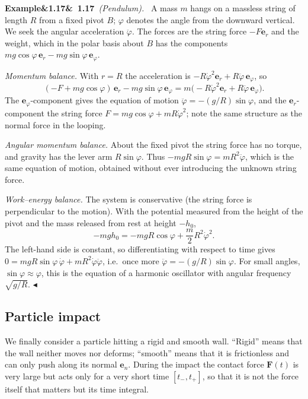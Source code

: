 \documentclass[11pt,a4paper,oneside]{report}
\numberwithin{equation}{chapter}
\newcommand{\vect}[1]{\bm{#1}}
\newcommand{\e}[1]{\vect{e}_{#1}}
\theoremstyle{plain}
\theoremstyle{definition}
\theoremstyle{remark}
\newenvironment{example}[2]{%
  \par\addvspace{\bigskipamount}\noindent
  \textbf{Example\ifx&#1&\else~#1\fi}\ \textit{(#2).}\ \ignorespaces}%
  {\hfill$\blacktriangleleft$\par\addvspace{\bigskipamount}}
\begin{document}
\begin{example}{1.17}{Pendulum}
A mass $m$ hangs on a massless string of length $R$ from a fixed pivot $B$; $\varphi$ denotes the angle from the
downward vertical. We seek the angular acceleration $\ddot\varphi$. The forces are the string force $-F\e r$ and the
weight, which in the polar basis about $B$ has the components $mg\cos\varphi\,\e r-mg\sin\varphi\,\e\varphi$.

\emph{Momentum balance.} With $r=R$ the acceleration is $-R\dot\varphi^2\e r+R\ddot\varphi\,\e\varphi$, so
\[
  (-F+mg\cos\varphi)\,\e r-mg\sin\varphi\,\e\varphi=m\big(-R\dot\varphi^2\e r+R\ddot\varphi\,\e\varphi\big).
\]
The $\e\varphi$-component gives the equation of motion $\ddot\varphi=-(g/R)\sin\varphi$, and the $\e r$-component the
string force $F=mg\cos\varphi+mR\dot\varphi^2$; note the same structure as the normal force in the looping.

\emph{Angular momentum balance.} About the fixed pivot the string force has no torque, and gravity has the lever
arm $R\sin\varphi$. Thus $-mgR\sin\varphi=mR^2\ddot\varphi$, which is the same equation of motion, obtained without
ever introducing the unknown string force.

\emph{Work--energy balance.} The system is conservative (the string force is perpendicular to the motion). With the
potential measured from the height of the pivot and the mass released from rest at height $-h_0$,
\[
  -mgh_0=-mgR\cos\varphi+\frac m2R^2\dot\varphi^2 .
\]
The left-hand side is constant, so differentiating with respect to time gives
$0=mgR\sin\varphi\,\dot\varphi+mR^2\dot\varphi\ddot\varphi$, i.e.\ once more $\ddot\varphi=-(g/R)\sin\varphi$.
For small angles, $\sin\varphi\approx\varphi$, this is the equation of a harmonic oscillator with angular frequency
$\sqrt{g/R}$.
\end{example}

\subsection{Particle impact}
We finally consider a particle hitting a rigid and smooth wall. ``Rigid'' means that the wall neither moves nor
deforms; ``smooth'' means that it is frictionless and can only push along its normal $\e n$. During the impact the
contact force $\vect F(t)$ is very large but acts only for a very short time $[t_-,t_+]$, so that it is not the
force itself that matters but its time integral.
\end{document}
